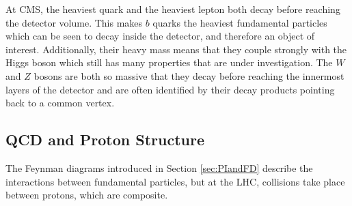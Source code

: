  At CMS, the heaviest quark and the heaviest
  lepton both decay before reaching
  the detector volume.
 This makes $b$ quarks the heaviest
  fundamental particles which can be seen
  to decay inside the detector,
  and therefore an object of interest.
 Additionally, their heavy mass means that they
  couple strongly with the Higgs boson
  which still has many properties that
  are under investigation.
 The $W$ and $Z$ bosons are both so 
  massive that they decay before reaching
  the innermost layers of the detector
  and are often identified by their decay products
  pointing back to a common vertex.
 
\begin{table}[tb]
\caption[Fundamental particle decay channels and rates]
{
 Below are listed the decay channels and 
  rates for each of the unstable
  fundamental particles.
 At CMS, with the detection apparatus
  located a finite distance away from the
  interaction vertex, particles such as the
  $W$, $Z$ and Higgs bosons,
  as well as the $t$ and $tau$, decay before
  reaching the first layer of the detector.
}
\label{tab:lifetimes}
\begin{center}
\end{center}
\end{table}
 

\subsection{QCD and Proton Structure}
 The Feynman diagrams introduced in Section \ref{sec:PIandFD}
  describe the interactions between fundamental particles,
  but at the LHC, collisions take place between
  protons, which are composite.

